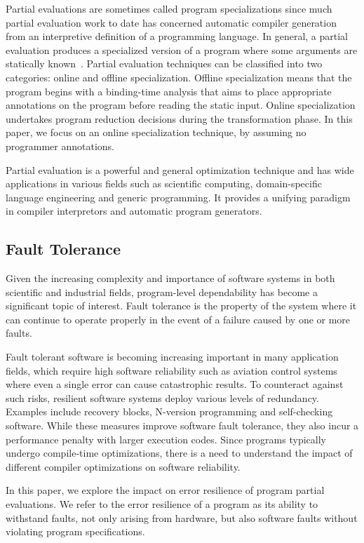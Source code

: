 Partial evaluations are sometimes called program specializations since much partial evaluation work to date has concerned automatic compiler generation from an interpretive definition of a programming language.
In general, a partial evaluation produces a specialized version of a program where some arguments are statically known~\cite{Jones1996}. 
Partial evaluation techniques can be classified into two categories: online and offline specialization.
Offline specialization means that the program begins with a binding-time analysis that aims to place appropriate annotations on the program before reading the static input.
Online specialization undertakes program reduction decisions during the transformation phase. In this paper, we focus on an online specialization technique, by assuming no programmer annotations. 

Partial evaluation is a powerful and general optimization technique and has wide applications in various fields such as scientific computing, domain-specific language engineering and generic programming.
It provides a unifying paradigm in compiler interpretors and automatic program generators.

\subsection{Fault Tolerance}
Given the increasing complexity and importance of software systems in both scientific and industrial fields, program-level dependability has become a significant topic of interest.
Fault tolerance is the property of the system where it can continue to operate properly in the event of a failure caused by one or more faults.

Fault tolerant software is becoming increasing important in many application fields, which require high software reliability such as aviation control systems where even a single error can cause catastrophic results.
To counteract against such risks, resilient software systems deploy various levels of redundancy.
Examples include recovery blocks, N-version programming and self-checking software.
While these measures improve software fault tolerance, they also incur a performance penalty with larger execution codes.
Since programs typically undergo compile-time optimizations, there is a need to understand the impact of different compiler optimizations on software reliability.

In this paper, we explore the impact on error resilience of program partial evaluations. We refer to the error resilience of a program as its ability to withstand faults, not only arising from hardware, but also software faults without violating program specifications. 

